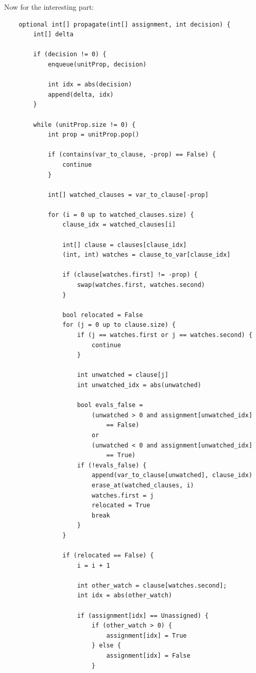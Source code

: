 \documentclass[../main.tex]{subfiles}
\begin{document}
Now for the interesting part:
\begin{lstlisting}
    optional int[] propagate(int[] assignment, int decision) {
        int[] delta

        if (decision != 0) {
            enqueue(unitProp, decision)

            int idx = abs(decision)
            append(delta, idx)
        }

        while (unitProp.size != 0) {
            int prop = unitProp.pop()

            if (contains(var_to_clause, -prop) == False) {
                continue
            }

            int[] watched_clauses = var_to_clause[-prop]

            for (i = 0 up to watched_clauses.size) {
                clause_idx = watched_clauses[i]

                int[] clause = clauses[clause_idx]
                (int, int) watches = clause_to_var[clause_idx]

                if (clause[watches.first] != -prop) {
                    swap(watches.first, watches.second)
                }

                bool relocated = False
                for (j = 0 up to clause.size) {
                    if (j == watches.first or j == watches.second) {
                        continue
                    }

                    int unwatched = clause[j]
                    int unwatched_idx = abs(unwatched)

                    bool evals_false = 
                        (unwatched > 0 and assignment[unwatched_idx]
                            == False)
                        or
                        (unwatched < 0 and assignment[unwatched_idx] 
                            == True)
                    if (!evals_false) {
                        append(var_to_clause[unwatched], clause_idx)
                        erase_at(watched_clauses, i)
                        watches.first = j
                        relocated = True
                        break
                    }
                }

                if (relocated == False) {
                    i = i + 1

                    int other_watch = clause[watches.second];
                    int idx = abs(other_watch)

                    if (assignment[idx] == Unassigned) {
                        if (other_watch > 0) {
                            assignment[idx] = True
                        } else {
                            assignment[idx] = False
                        }


\end{lstlisting}
\end{document}
